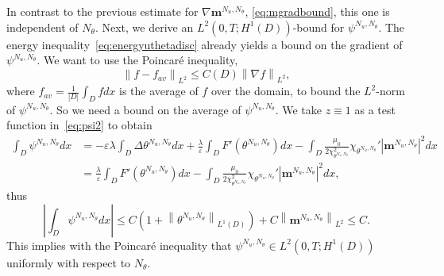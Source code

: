 \documentclass[10pt,letterpaper,twoside]{amsart}
\theoremstyle{definition}{\newtheorem{definition}[lemma]{Definition}}
\theoremstyle{note}{\newtheorem{claim}{Claim}[section]
\newtheorem*{claim*}{Claim}}
\numberwithin{equation}{section}
\newcommand{\dom}{D}
\newcommand{\norm}[1]{\left\| #1 \right\|}
\newcommand{\Grad}{\nabla}
\newcommand{\bm}{\mathbf{m}}
\newcommand{\bmb}{\mathbf{m}^{N_u,N_\theta}}
\newcommand{\psib}{\psi^{N_u,N_\theta}}
\begin{document}
In contrast to the previous estimate for $\Grad\bmb$, \eqref{eq:mgradbound}, this one is independent of $N_\theta$.
Next, we derive an $L^2(0,T;H^1(\dom))$-bound for $\psi^{N_u,N_\theta}$. The energy inequality~\eqref{eq:energyuthetadisc} already yields a bound on  the gradient of $\psi^{N_u,N_\theta}$. We want to use the Poincar\'e inequality,
\begin{equation}\label{eq:poincare}
	\norm{f-f_{av}}_{L^2}\leq C(\dom)\norm{\Grad f}_{L^2},
\end{equation}
where $f_{av} = \frac{1}{|\dom|}\int_{\dom} f dx$ is the average of $f$ over the domain, to bound the $L^2$-norm of $\psib$. So we need a bound on the average of $\psi^{N_u,N_\theta}$. We take $z\equiv 1$ as a test function in~\eqref{eq:psi2} to obtain
\begin{equation*}
	\begin{split}
	\int_{\dom} \psi^{N_u,N_\theta} dx& = -\varepsilon\lambda\int_{\dom} \Delta \theta^{N_u,N_\theta} dx + \frac{\lambda}{\varepsilon} \int_{\dom} F'(\theta^{N_u,N_\theta})dx -\int_{\dom} \frac{\mu_0}{2\chi_{\theta^{N_u,N_\theta}}^2}\chi_{\theta^{N_u,N_\theta}}' |\bm^{N_u,N_\theta}|^2 dx \\
	& =  \frac{\lambda}{\varepsilon} \int_{\dom} F'(\theta^{N_u,N_\theta})dx-\int_{\dom} \frac{\mu_0}{2\chi_{\theta^{N_u,N_\theta}}^2}\chi_{\theta^{N_u,N_\theta}}' |\bm^{N_u,N_\theta}|^2 dx,
	\end{split}
\end{equation*}
thus
\begin{equation}\label{eq:psiaverageestimate}
	\left|\int_{\dom} \psi^{N_u,N_\theta} dx \right|\leq C(1 +  \norm{\theta^{N_u,N_\theta}}_{L^1(\dom)})+ C \norm{\bm^{N_u,N_\theta}}_{L^2}\leq C.
\end{equation}
This implies with the Poincar\'e inequality that $\psi^{N_u,N_\theta} \in L^2(0,T;H^1(\dom))$ uniformly with respect to $N_\theta$. 
\end{document}
